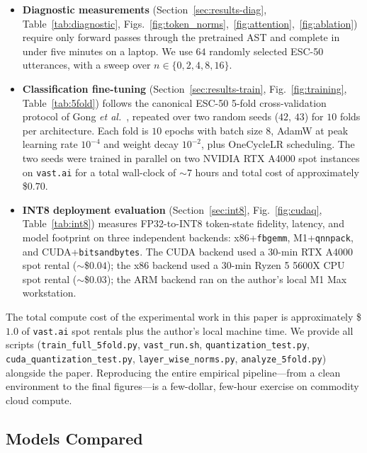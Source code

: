 \documentclass[conference]{IEEEtran}
\begin{document}
\begin{itemize}
    \item \textbf{Diagnostic measurements} (Section~\ref{sec:results-diag}, Table~\ref{tab:diagnostic}, Figs.~\ref{fig:token_norms},~\ref{fig:attention},~\ref{fig:ablation}) require only forward passes through the pretrained AST and complete in under five minutes on a laptop. We use $64$ randomly selected ESC-50 utterances, with a sweep over $n \in \{0, 2, 4, 8, 16\}$.
    \item \textbf{Classification fine-tuning} (Section~\ref{sec:results-train}, Fig.~\ref{fig:training}, Table~\ref{tab:5fold}) follows the canonical ESC-50 5-fold cross-validation protocol of Gong \emph{et al.}~\cite{gong2021ast}, repeated over two random seeds ($42$, $43$) for $10$ folds per architecture. Each fold is $10$ epochs with batch size $8$, AdamW \cite{loshchilov2019decoupled} at peak learning rate $10^{-4}$ and weight decay $10^{-2}$, plus OneCycleLR scheduling. The two seeds were trained in parallel on two NVIDIA RTX A4000 spot instances on \texttt{vast.ai} for a total wall-clock of $\sim 7$ hours and total cost of approximately \$$0.70$.
    \item \textbf{INT8 deployment evaluation} (Section~\ref{sec:int8}, Fig.~\ref{fig:cudaq}, Table~\ref{tab:int8}) measures FP32-to-INT8 token-state fidelity, latency, and model footprint on three independent backends: x86+\texttt{fbgemm}, M1+\texttt{qnnpack}, and CUDA+\texttt{bitsandbytes}. The CUDA backend used a $30$-min RTX A4000 spot rental ($\sim$\$$0.04$); the x86 backend used a $30$-min Ryzen 5 5600X CPU spot rental ($\sim$\$$0.03$); the ARM backend ran on the author's local M1 Max workstation.
\end{itemize}

The total compute cost of the experimental work in this paper is approximately \$$1.0$ of \texttt{vast.ai} spot rentals plus the author's local machine time. We provide all scripts (\texttt{train\_full\_5fold.py}, \texttt{vast\_run.sh}, \texttt{quantization\_test.py}, \texttt{cuda\_quantization\_test.py}, \texttt{layer\_wise\_norms.py}, \texttt{analyze\_5fold.py}) alongside the paper. Reproducing the entire empirical pipeline---from a clean environment to the final figures---is a few-dollar, few-hour exercise on commodity cloud compute.

\subsection{Models Compared}
\end{document}
